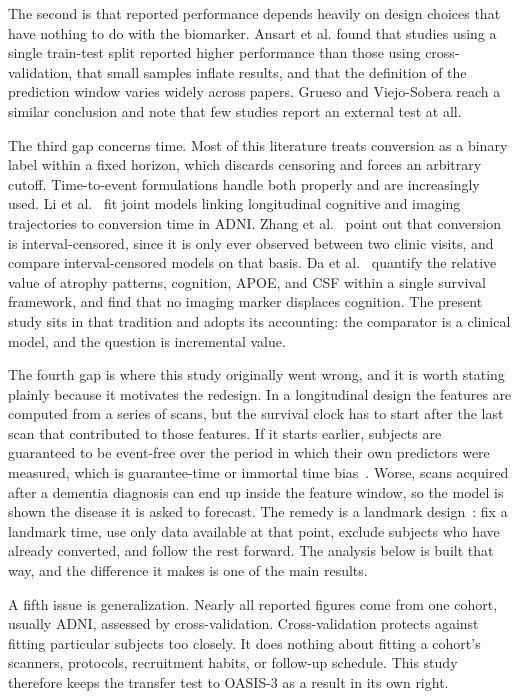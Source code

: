 \documentclass[blue]{ludusofficial}  %
\begin{document}
The second is that reported performance depends heavily on design choices that have nothing to do with the biomarker. Ansart et al. found that studies using a single train-test split reported higher performance than those using cross-validation, that small samples inflate results, and that the definition of the prediction window varies widely across papers. Grueso and Viejo-Sobera reach a similar conclusion and note that few studies report an external test at all.

The third gap concerns time. Most of this literature treats conversion as a binary label within a fixed horizon, which discards censoring and forces an arbitrary cutoff. Time-to-event formulations handle both properly and are increasingly used. Li et al.~\cite{li2017prediction} fit joint models linking longitudinal cognitive and imaging trajectories to conversion time in ADNI. Zhang et al.~\cite{zhang2024interval} point out that conversion is interval-censored, since it is only ever observed between two clinic visits, and compare interval-censored models on that basis. Da et al.~\cite{da2014integration} quantify the relative value of atrophy patterns, cognition, APOE, and CSF within a single survival framework, and find that no imaging marker displaces cognition. The present study sits in that tradition and adopts its accounting: the comparator is a clinical model, and the question is incremental value.

The fourth gap is where this study originally went wrong, and it is worth stating plainly because it motivates the redesign. In a longitudinal design the features are computed from a series of scans, but the survival clock has to start after the last scan that contributed to those features. If it starts earlier, subjects are guaranteed to be event-free over the period in which their own predictors were measured, which is guarantee-time or immortal time bias~\cite{anderson1983analysis,giobbie2013guarantee}. Worse, scans acquired after a dementia diagnosis can end up inside the feature window, so the model is shown the disease it is asked to forecast. The remedy is a landmark design~\cite{anderson1983analysis}: fix a landmark time, use only data available at that point, exclude subjects who have already converted, and follow the rest forward. The analysis below is built that way, and the difference it makes is one of the main results.

A fifth issue is generalization. Nearly all reported figures come from one cohort, usually ADNI, assessed by cross-validation. Cross-validation protects against fitting particular subjects too closely. It does nothing about fitting a cohort's scanners, protocols, recruitment habits, or follow-up schedule. This study therefore keeps the transfer test to OASIS-3 as a result in its own right.
\end{document}
